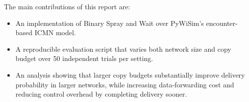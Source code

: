 The main contributions of this report are:
\begin{itemize}
    \item An implementation of Binary Spray and Wait over PyWiSim's encounter-based ICMN model.
    \item A reproducible evaluation script that varies both network size and copy budget over 50 independent trials per setting.
    \item An analysis showing that larger copy budgets substantially improve delivery probability in larger networks, while increasing data-forwarding cost and reducing control overhead by completing delivery sooner.
\end{itemize}
